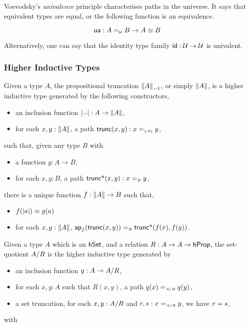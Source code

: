 Voevodsky's \emph{univalence} principle characterises paths in the universe. It says that equivalent types are equal, or
the following function is an equivalence.

\[
  \ua : A \id_{\UU} B \to A \eqv B
\]


Alternatively, one can say that the identity type family $\operatorname{\mathsf{id}} : \mathcal{U} \to \mathcal{U}$ is univalent.

\subsubsection{Higher Inductive Types}



\begin{definition}
  Given a type $A$, the propositional truncation $\Trunc[-1]{A}$, or simply $\Trunc{A}$, is a higher inductive type
  generated by the following constructors,
  \begin{itemize}
    \item an inclusion function $\trunc{\blank} : A \to \Trunc{A}$,
    \item for each $x, y : \Trunc{A}$, a path $\term{trunc}(x,y) : x \id_{\Trunc{A}} y$,
  \end{itemize}
  such that, given any type $B$ with
  \begin{itemize}
    \item a function $g : A \to B$,
    \item for each $x, y : B$, a path $\term{trunc*}(x,y) : x \id_{B} y$,
  \end{itemize}
  there is a unique function $f : \Trunc{A} \to B$ such that,
  \begin{itemize}
    \item $f(\vert a\vert) \equiv g(a)$
    \item for each $x, y : \Trunc{A}$, $\ap{f}{\term{trunc}(x,y)} \id_{B} \term{trunc*}(f(x),f(y))$.
  \end{itemize}
\end{definition}

\begin{definition}
  Given a type $A$ which is an $\mathsf{hSet}$, and a relation $R : A \to A \to \mathsf{hProp}$, the set-quotient ${A}/{R}$ is the
  higher inductive type generated by
  \begin{itemize}
    \item an inclusion function $q : A \to {A}/{R}$,
    \item for each $x, y : A$ such that $R(x,y)$, a path $q(x) \id_{\quot{A}{R}} q(y)$,
    \item a set truncation, for each $x, y : {A}/{R}$ and $r, s : x \id_{\quot{A}{R}} y$, we have $r \id s$,
  \end{itemize}
  with 
\end{definition}

